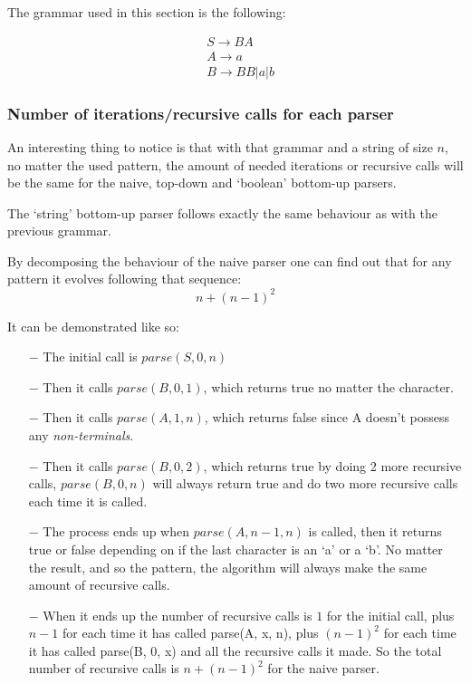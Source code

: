 The grammar used in this section is the following:

\begin{align*}
    &S \to BA\\
    &A \to a\\
    &B \to BB|a|b
\end{align*}

\subsubsection{Number of iterations/recursive calls for each parser}

An interesting thing to notice is that with that grammar and a string of size $n$, no matter the used pattern, the amount of needed iterations or recursive calls will be the same for the naive, top-down and `boolean' bottom-up parsers.

The `string' bottom-up parser follows exactly the same behaviour as with the previous grammar.

By decomposing the behaviour of the naive parser one can find out that for any pattern it evolves following that sequence:
\begin{equation}\label{seq:naive}
n + (n - 1)^2
\end{equation}

It can be demonstrated like so:

\begin{itemize}
    \item[$-$] The initial call is $parse(S, 0, n)$
    \item[$-$] Then it calls $parse(B, 0, 1)$, which returns true no matter the character.
    \item[$-$] Then it calls $parse(A, 1, n)$, which returns false since A doesn't possess any \textit{non-terminals}.
    \item[$-$] Then it calls $parse(B, 0, 2)$, which returns true by doing 2 more recursive calls, $parse(B, 0, n)$ will always return true and do two more recursive calls each time it is called.
    \item[$-$] The process ends up when $parse(A, n - 1, n)$ is called, then it returns true or false depending on if the last character is an `a' or a `b'. No matter the result, and so the pattern, the algorithm will always make the same amount of recursive calls.
    \item[$-$] When it ends up the number of recursive calls is $1$ for the initial call, plus $n - 1$ for each time it has called parse(A, x, n), plus $(n - 1)^2$ for each time it has called parse(B, 0, x) and all the recursive calls it made. So the total number of recursive calls is $n + (n - 1)^2$ for the naive parser.
\end{itemize}

